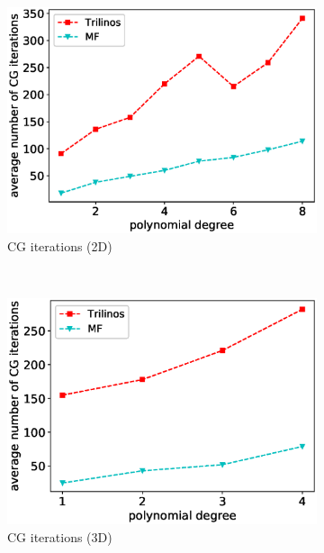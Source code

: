 \documentclass[AMA,STIX1COL]{WileyNJD-v2}
\begin{document}
\begin{figure}[!ht]
  \begin{subfigure}[b]{0.49\textwidth}
    \centering
    \includegraphics[width=\textwidth]{CSL_Munich_cg2d.eps}
    \caption{CG iterations (2D)}
    \label{fig:benchmark_miehe_CSL_cg2}
  \end{subfigure}
  ~
  \begin{subfigure}[b]{0.49\textwidth}
    \centering
    \includegraphics[width=\textwidth]{CSL_Munich_cg3d.eps}
    \caption{CG iterations (3D)}
    \label{fig:benchmark_miehe_CSL_cg3}
  \end{subfigure}
  ~
  \begin{subfigure}[b]{0.49\textwidth}
    \centering

\end{subfigure}
\end{figure}
\end{document}
